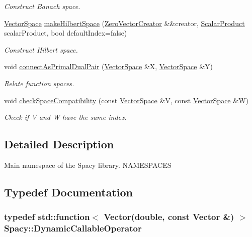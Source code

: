 \begin{DoxyCompactItemize}
\begin{DoxyCompactList}\small\item\em Construct Banach space. \end{DoxyCompactList}\item 
\hypertarget{namespaceSpacy_a927756dd42df3e79c302df1f8f635b65}{\hyperlink{classSpacy_1_1VectorSpace}{Vector\-Space} \hyperlink{namespaceSpacy_a927756dd42df3e79c302df1f8f635b65}{make\-Hilbert\-Space} (\hyperlink{classSpacy_1_1ZeroVectorCreator}{Zero\-Vector\-Creator} \&\&creator, \hyperlink{namespaceSpacy_aa995526aa0e3fa58aca8dd6772311cad}{Scalar\-Product} scalar\-Product, bool default\-Index=false)}\label{namespaceSpacy_a927756dd42df3e79c302df1f8f635b65}

\begin{DoxyCompactList}\small\item\em Construct Hilbert space. \end{DoxyCompactList}\item 
void \hyperlink{namespaceSpacy_a72844d3d381380c382cd9dce912e2664}{connect\-As\-Primal\-Dual\-Pair} (\hyperlink{classSpacy_1_1VectorSpace}{Vector\-Space} \&X, \hyperlink{classSpacy_1_1VectorSpace}{Vector\-Space} \&Y)
\begin{DoxyCompactList}\small\item\em Relate function spaces. \end{DoxyCompactList}\item 
void \hyperlink{namespaceSpacy_aae18423491adef608743902f1c40844e}{check\-Space\-Compatibility} (const \hyperlink{classSpacy_1_1VectorSpace}{Vector\-Space} \&V, const \hyperlink{classSpacy_1_1VectorSpace}{Vector\-Space} \&W)
\begin{DoxyCompactList}\small\item\em Check if V and W have the same index. \end{DoxyCompactList}\end{DoxyCompactItemize}


\subsection{Detailed Description}
Main namespace of the Spacy library. N\-A\-M\-E\-S\-P\-A\-C\-E\-S 

\subsection{Typedef Documentation}
\hypertarget{namespaceSpacy_a052e6b83b913fc316b0c2a2cd9535431}{
\subsubsection[{Dynamic\-Callable\-Operator}]{\setlength{\rightskip}{0pt plus 5cm}typedef std\-::function$<$ {\bf Vector}(double, const {\bf Vector} \&) $>$ {\bf Spacy\-::\-Dynamic\-Callable\-Operator}}}\label{namespaceSpacy_a052e6b83b913fc316b0c2a2cd9535431}


